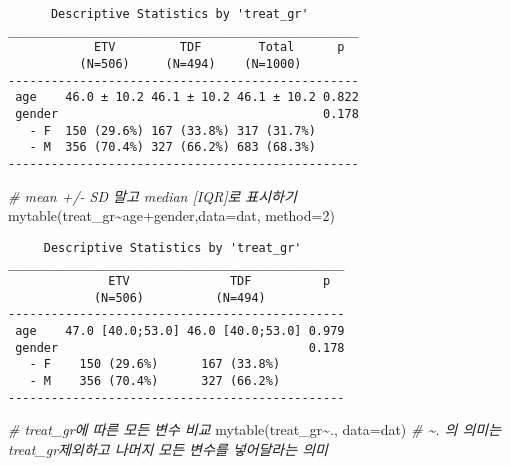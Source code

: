 \documentclass[
]{article}
\newenvironment{Shaded}{\begin{snugshade}}{\end{snugshade}}
\newcommand{\AttributeTok}[1]{\textcolor[rgb]{0.77,0.63,0.00}{#1}}
\newcommand{\CommentTok}[1]{\textcolor[rgb]{0.56,0.35,0.01}{\textit{#1}}}
\newcommand{\DecValTok}[1]{\textcolor[rgb]{0.00,0.00,0.81}{#1}}
\newcommand{\FunctionTok}[1]{\textcolor[rgb]{0.00,0.00,0.00}{#1}}
\newcommand{\NormalTok}[1]{#1}
\newcommand{\SpecialCharTok}[1]{\textcolor[rgb]{0.00,0.00,0.00}{#1}}
\begin{document}
\begin{verbatim}
      Descriptive Statistics by 'treat_gr'      
_________________________________________________ 
            ETV         TDF        Total      p  
          (N=506)     (N=494)    (N=1000)  
------------------------------------------------- 
 age    46.0 ± 10.2 46.1 ± 10.2 46.1 ± 10.2 0.822
 gender                                     0.178
   - F  150 (29.6%) 167 (33.8%) 317 (31.7%)      
   - M  356 (70.4%) 327 (66.2%) 683 (68.3%)      
------------------------------------------------- 
\end{verbatim}

\begin{Shaded}
\begin{Highlighting}[]
\CommentTok{\# mean +/{-} SD 말고 median [IQR]로 표시하기}
\FunctionTok{mytable}\NormalTok{(treat\_gr}\SpecialCharTok{\textasciitilde{}}\NormalTok{age}\SpecialCharTok{+}\NormalTok{gender,}\AttributeTok{data=}\NormalTok{dat, }\AttributeTok{method=}\DecValTok{2}\NormalTok{)}
\end{Highlighting}
\end{Shaded}

\begin{verbatim}
     Descriptive Statistics by 'treat_gr'     
_______________________________________________ 
              ETV              TDF          p  
            (N=506)          (N=494)     
----------------------------------------------- 
 age    47.0 [40.0;53.0] 46.0 [40.0;53.0] 0.979
 gender                                   0.178
   - F    150 (29.6%)      167 (33.8%)         
   - M    356 (70.4%)      327 (66.2%)         
----------------------------------------------- 
\end{verbatim}

\begin{Shaded}
\begin{Highlighting}[]
\CommentTok{\# treat\_gr에 따른 모든 변수 비교}
\FunctionTok{mytable}\NormalTok{(treat\_gr}\SpecialCharTok{\textasciitilde{}}\NormalTok{., }\AttributeTok{data=}\NormalTok{dat) }\CommentTok{\# \textasciitilde{}. 의 의미는 \textquotesingle{}treat\_gr\textquotesingle{}제외하고 나머지 모든 변수를 넣어달라는 의미}
\end{Highlighting}
\end{Shaded}
\end{document}
